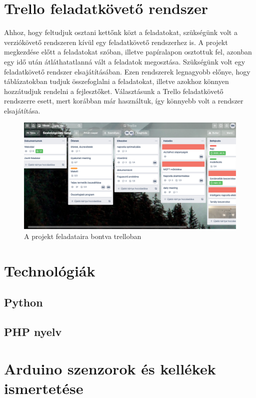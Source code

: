 \documentclass[
]{thesis-ekf}
\theoremstyle{definition}
\theoremstyle{remark}
\begin{document}
	\section{Trello feladatkövető rendszer}
	\par Ahhoz, hogy feltudjuk osztani kettőnk közt a feladatokat, szükségünk volt a verziókövető rendszeren kívül egy feladatkövető rendszerhez is. A projekt megkezdése előtt a feladatokat szóban, illetve papíralapon osztottuk fel, azonban egy idő után átláthatatlanná vált a feladatok megosztása. Szükségünk volt egy feladatkövető rendszer elsajátításában. Ezen rendszerek legnagyobb előnye, hogy táblázatokban tudjuk összefoglalni a feladatokat, illetve azokhoz könnyen hozzátudjuk rendelni a fejlesztőket. Választásunk a Trello feladatkövető rendszerre esett, mert korábban már használtuk, így könnyebb volt a rendszer elsajátítása. 
	
	
	\begin{figure}[h]
		\centering
		\includegraphics[scale=0.35]{./images/trello}
		\caption{A projekt feladataira bontva trelloban}
		\label{fig:trello}
	\end{figure}
	
	
	\section{Technológiák}
		\subsection{Python}
		
		
		\subsection{PHP nyelv}
	\section{Arduino szenzorok és kellékek ismertetése}
\end{document}
